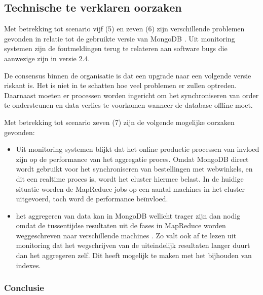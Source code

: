 \clearpage

\subsection{Technische te verklaren oorzaken}

Met betrekking tot scenario vijf (5) en zeven (6) zijn verschillende problemen gevonden in relatie tot de gebruikte versie van MongoDB \parencite{mongo_changelog}. Uit monitoring systemen zijn de foutmeldingen terug te relateren aan software bugs die aanwezige zijn in versie 2.4.

De consensus binnen de organisatie is dat een upgrade naar een volgende versie riskant is. Het is niet in te schatten hoe veel problemen er zullen optreden. Daarnaast moeten er processen worden ingericht om het synchroniseren van order te ondersteunen en data verlies te voorkomen wanneer de database offline moet.
    
Met betrekking tot scenario zeven (7) zijn de volgende mogelijke oorzaken gevonden:

\begin{itemize}
    \item Uit monitoring systemen blijkt dat het online productie processen van invloed zijn op de performance van het aggregatie proces. Omdat MongoDB direct wordt gebruikt voor het synchroniseren van bestellingen met webwinkels, en dit een realtime proces is, wordt het cluster hiermee belast. In de huidige situatie worden de MapReduce jobs op een aantal machines in het cluster uitgevoerd, toch word de performance beïnvloed.
    \item het aggregeren van data kan in MongoDB wellicht trager zijn dan nodig omdat de tussentijdse resultaten uit de fases in MapReduce worden weggeschreven naar verschillende machines \parencite{mongo_mr_shards}. Zo valt ook af te lezen uit monitoring dat het wegschrijven van de uiteindelijk resultaten langer duurt dan het aggregeren zelf. Dit heeft mogelijk te maken met het bijhouden van indexes.  \parencite{mongo_write_performance}
\end{itemize}


\subsubsection{\textbf{Conclusie}}
\label{subsec:3.3.2}

